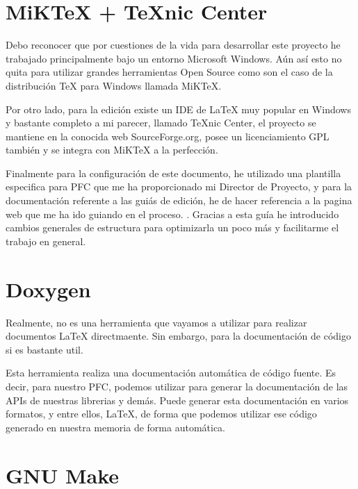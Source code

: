 
\section*{MiK\TeX{}  + \TeX nic Center}

Debo reconocer que por cuestiones de la vida para desarrollar este proyecto he trabajado principalmente bajo un entorno Microsoft Windows. Aún así esto no quita para utilizar grandes herramientas Open Source como son el caso de la distribución \TeX{} para Windows llamada MiK\TeX \cite{website:miktex}. 

Por otro lado, para la edición existe un IDE de \LaTeX{} muy popular en Windows y bastante completo a mi parecer, llamado \TeX nic Center, el proyecto se mantiene en la conocida web SourceForge.org, posee un licenciamiento GPL también y se integra con MiK\TeX{} a la perfección.

Finalmente para la configuración de este documento, he utilizado una plantilla especifica para PFC que me ha proporcionado mi Director de Proyecto, y para la documentación referente a las guiás de edición, he de hacer referencia a la pagina web que me ha ido guiando en el proceso. \cite{website:latex}. Gracias a esta guía he introducido cambios generales de estructura para optimizarla un poco más y facilitarme el trabajo en general.

\section*{Doxygen}

Realmente,  \cite{website:asterisk} no es una herramienta
que vayamos a utilizar para realizar documentos \LaTeX{}
directmaente. Sin embargo, para la documentación de código si es
bastante util.

Esta herramienta realiza una documentación automática de código
fuente. Es decir, para nuestro PFC, podemos utilizar para generar la
documentación de las APIs de nuestras librerias y demás. Puede generar
esta documentación en varios formatos, y entre ellos, \LaTeX, de forma
que podemos utilizar ese código generado en nuestra memoria de forma
automática.

\section*{GNU Make}

